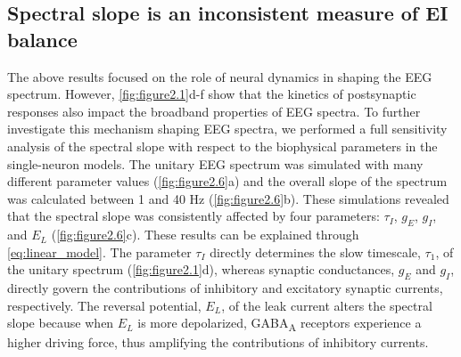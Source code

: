 \subsection{Spectral slope is an inconsistent measure of EI balance}
The above results focused on the role of neural dynamics in shaping the EEG spectrum. However, \autoref{fig:figure2.1}d-f show that the kinetics of postsynaptic responses also impact the broadband properties of EEG spectra. To further investigate this mechanism shaping EEG spectra, we performed a full sensitivity analysis of the spectral slope with respect to the biophysical parameters in the single-neuron models. The unitary EEG spectrum was simulated with many different parameter values (\autoref{fig:figure2.6}a) and the overall slope of the spectrum was calculated \cite{Donoghue2020} between 1 and 40 \unit{\hertz} (\autoref{fig:figure2.6}b). These simulations revealed that the spectral slope was consistently affected by four parameters: $\tau_I$, $g_E$, $g_I$, and $E_L$ (\autoref{fig:figure2.6}c). These results can be explained through \ref{eq:linear_model}. The parameter $\tau_I$ directly determines the slow timescale, $\tau_1$, of the unitary spectrum (\autoref{fig:figure2.1}d), whereas synaptic conductances, $g_E$ and $g_I$, directly govern the contributions of inhibitory and excitatory synaptic currents, respectively. The reversal potential, $E_L$, of the leak current alters the spectral slope because when $E_L$ is more depolarized, GABA\textsubscript{A} receptors experience a higher driving force, thus amplifying the contributions of inhibitory currents. 


